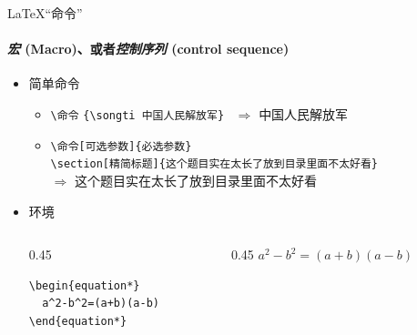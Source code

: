 \begin{frame}[fragile]{\LaTeX{}“命令”}
  \framesubtitle{\emph{宏} (Macro)、或者\emph{控制序列} (control sequence)}
\begin{itemize}
\item 简单命令
  \begin{itemize}
    \item \verb|\命令|\hspace{2em}
    \verb|{\songti 中国人民解放军}| ~$\Rightarrow$ {\songti 中国人民解放军}
  \item \verb|\命令[可选参数]{必选参数}|\\
\verb|\section[精简标题]{这个题目实在太长了放到目录里面不太好看}|\\
$\Rightarrow$ { \hspace{1em} \songti 这个题目实在太长了放到目录里面不太好看}
  \end{itemize}
\item 环境
  \begin{columns}[c]
  \begin{column}{0.45\textwidth}
    \begin{lstlisting}[basicstyle=\ttfamily]
\begin{equation*}
  a^2-b^2=(a+b)(a-b)
\end{equation*}
\end{lstlisting}
\end{column}\hspace{1em}
  \begin{column}{0.45\textwidth}
$ a^2-b^2=(a+b)(a-b)$
\end{column}
  \end{columns}
\end{itemize}
\end{frame}
%
% 
